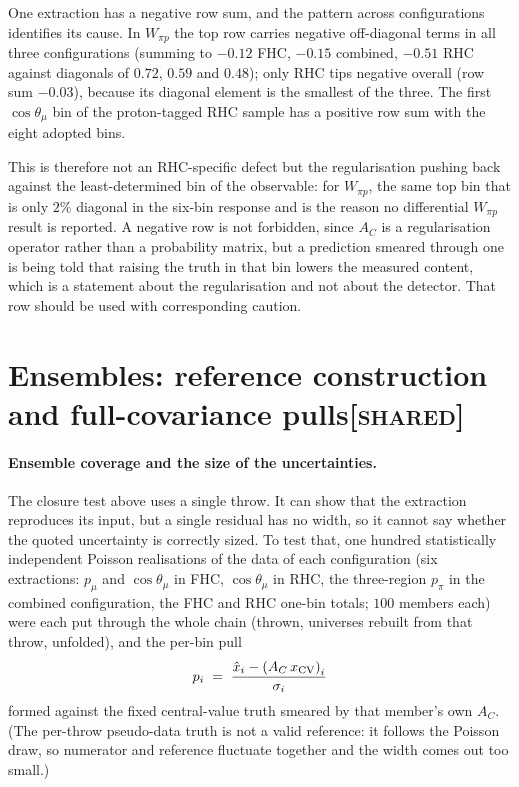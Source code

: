 \documentclass[11pt,a4paper]{article}
\newcommand{\scopetag}[1]{\hfill{\normalfont\small\textsc{[#1]}}}
\begin{document}
One extraction has a negative row sum, and the pattern across configurations identifies its
cause. In $W_{\pi p}$ the top row carries negative off-diagonal terms in all three
configurations (summing to $-0.12$ FHC, $-0.15$ combined, $-0.51$ RHC against diagonals of
$0.72$, $0.59$ and $0.48$); only RHC tips negative overall (row sum $-0.03$), because its
diagonal element is the smallest of the three. The first $\cos\theta_\mu$ bin of the
proton-tagged RHC sample has a positive row sum with the eight adopted bins.

This is therefore not an RHC-specific defect but the regularisation pushing back against the
least-determined bin of the observable: for $W_{\pi p}$, the same top bin that is only
$2\%$ diagonal in the six-bin response and is the reason no differential $W_{\pi p}$ result is
reported.  A negative row is not forbidden, since $A_C$ is a regularisation
operator rather than a probability matrix, but a prediction smeared through one is being
told that raising the truth in that bin lowers the measured content, which is a
statement about the regularisation and not about the detector. That row should be used with
corresponding caution.


\section[Ensembles: reference construction and full-covariance pulls]{Ensembles: reference construction and full-covariance pulls\scopetag{shared}}
\label{sec:supp_ensemble}

\paragraph{Ensemble coverage and the size of the uncertainties.}
\label{par:ensemble}
The closure test above uses a single throw.  It can show that the extraction reproduces
its input, but a single residual has no width, so it cannot say whether the quoted
uncertainty is correctly sized.  To test that, one hundred statistically independent
Poisson realisations of the data of each configuration (six extractions: $p_\mu$ and
$\cos\theta_\mu$ in FHC, $\cos\theta_\mu$ in RHC, the three-region $p_\pi$ in the combined
configuration, the FHC and RHC one-bin totals; $100$ members each) were each put through the
whole chain (thrown, universes rebuilt from that throw, unfolded), and the per-bin pull
\[
  p_i \;=\; \frac{\hat{x}_i - \left(A_C\,x_{\rm CV}\right)_i}{\sigma_i}
\]
formed against the fixed central-value truth smeared by that member's own $A_C$.  (The
per-throw pseudo-data truth is not a valid reference: it follows the Poisson draw, so
numerator and reference fluctuate together and the width comes out too small.)
\end{document}
